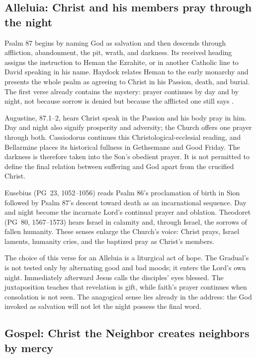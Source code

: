 \elementguard
\subsection*{Alleluia: Christ and his members pray through the night }

Psalm 87 begins by naming God as salvation and then descends through affliction,
abandonment, the pit, wrath, and darkness. Its received heading assigns the
instruction to Heman the Ezrahite, or in another Catholic line to David
speaking in his name. Haydock relates Heman to the early monarchy and presents
the whole psalm as agreeing to Christ in his Passion, death, and burial. The
first verse already contains the mystery: prayer continues by day and by
night, not because sorrow is denied but because the afflicted one still says
.

Augustine,  87.1--2, hears Christ speak in the
Passion and his body pray in him. Day and night also signify prosperity and
adversity; the Church offers one prayer through both. Cassiodorus continues
this Christological-ecclesial reading, and Bellarmine places its historical
fullness in Gethsemane and Good Friday. The darkness is therefore taken into
the Son's obedient prayer. It is not permitted to define the final relation
between suffering and God apart from the crucified Christ.

Eusebius (PG~23, 1052--1056) reads Psalm 86's proclamation of birth in Sion
followed by Psalm 87's descent toward death as an incarnational sequence. Day
and night become the incarnate Lord's continual prayer and oblation. Theodoret
(PG~80, 1567--1573) hears Israel in calamity and, through Israel, the sorrows
of fallen humanity. These senses enlarge the Church's voice: Christ prays,
Israel laments, humanity cries, and the baptized pray as Christ's members.

The choice of this verse for an Alleluia is a liturgical act of hope. The
Gradual's  is not tested only by alternating good and
bad moods; it enters the Lord's own night. Immediately afterward Jesus calls
the disciples' eyes blessed. The juxtaposition teaches that revelation is
gift, while faith's prayer continues when consolation is not seen. The
anagogical sense lies already in the address: the God invoked as salvation
will not let the night possess the final word.

\elementguard
\subsection*{Gospel: Christ the Neighbor creates neighbors by mercy }

